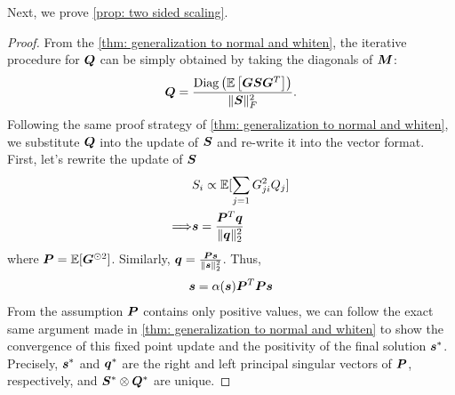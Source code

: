 Next, we prove \cref{prop: two sided scaling}.
\begin{proof}
    From the \cref{thm: generalization to normal and whiten}, the iterative procedure for ${\bm{Q}}$ can be simply obtained by taking the diagonals of ${\bm{M}}$:
    \begin{align*}
        {\bm{Q}} = \frac{\operatorname{Diag}\left(\mathbb{E}\left[{\bm{G}}{\bm{S}}{\bm{G}}^T\right]\right)}{\Vert{\bm{S}}\Vert_F^2}.
    \end{align*}
    Following the same proof strategy of \cref{thm: generalization to normal and whiten}, we substitute ${\bm{Q}}$ into the update of ${\bm{S}}$ and re-write it into the vector format. First, let's rewrite the update of ${\bm{S}}$
    \begin{align*}
        &S_i \propto \mathbb{E}[\sum_{j=1}G_{ji}^2 Q_j]\\
        \Longrightarrow& {\bm{s}} = \frac{{\bm{P}}^T {\bm{q}}}{\Vert{\bm{q}}\Vert_2^2}
    \end{align*}
    where ${\bm{P}}=\mathbb{E}[{\bm{G}}^{\odot 2}]$. Similarly, ${\bm{q}} = \frac{{\bm{P}}{\bm{s}}}{\Vert{\bm{s}}\Vert_2^2}$.
    Thus,
    \begin{align*}
        {\bm{s}} = \alpha({\bm{s}}) {\bm{P}}^T{\bm{P}} {\bm{s}}
    \end{align*}
    From the assumption ${\bm{P}}$ contains only positive values, we can follow the exact same argument made in \cref{thm: generalization to normal and whiten} to show the convergence of this fixed point update and the positivity of the final solution ${\bm{s}}^*$. Precisely, ${\bm{s}}^*$ and ${\bm{q}}^*$ are the right and left principal singular vectors of ${\bm{P}}$, respectively, and ${\bm{S}}^*\otimes {\bm{Q}}^*$ are unique. 
\end{proof}